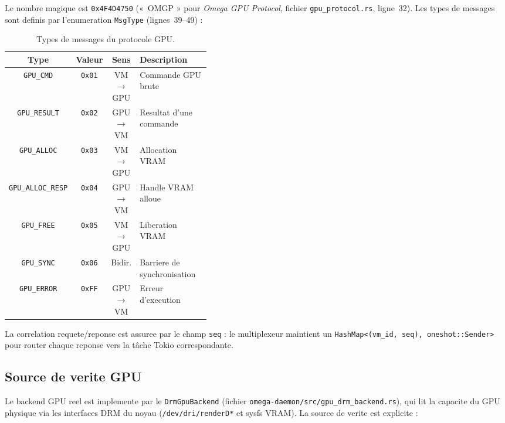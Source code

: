 Le nombre magique est \texttt{0x4F4D4750} («~OMGP » pour \textit{Omega GPU Protocol}, fichier \texttt{gpu\_protocol.rs}, ligne~32). Les types de messages sont definis par l'enumeration \texttt{MsgType} (lignes~39--49) :

\begin{table}[htbp]
    \centering
    \caption{Types de messages du protocole GPU.}
    \label{tab:gpu-msg-types}
    \begin{tabular}{c c c p{0.40\linewidth}}
        \toprule
        \textbf{Type} & \textbf{Valeur} & \textbf{Sens} & \textbf{Description} \\
        \midrule
        \texttt{GPU\_CMD} & \texttt{0x01} & VM$\to$GPU & Commande GPU brute \\
        \texttt{GPU\_RESULT} & \texttt{0x02} & GPU$\to$VM & Resultat d'une commande \\
        \texttt{GPU\_ALLOC} & \texttt{0x03} & VM$\to$GPU & Allocation VRAM \\
        \texttt{GPU\_ALLOC\_RESP} & \texttt{0x04} & GPU$\to$VM & Handle VRAM alloue \\
        \texttt{GPU\_FREE} & \texttt{0x05} & VM$\to$GPU & Liberation VRAM \\
        \texttt{GPU\_SYNC} & \texttt{0x06} & Bidir. & Barriere de synchronisation \\
        \texttt{GPU\_ERROR} & \texttt{0xFF} & GPU$\to$VM & Erreur d'execution \\
        \bottomrule
    \end{tabular}
\end{table}

La correlation requete/reponse est assuree par le champ \texttt{seq} : le multiplexeur maintient un \texttt{HashMap<(vm\_id, seq), oneshot::Sender>} pour router chaque reponse vers la tâche Tokio correspondante.

\subsection{Source de verite GPU}
\label{subsec:gpu-source-verite}

Le backend GPU reel est implemente par le \texttt{DrmGpuBackend} (fichier \texttt{omega-daemon/src/gpu\_drm\_backend.rs}), qui lit la capacite du GPU physique via les interfaces DRM du noyau (\texttt{/dev/dri/renderD*} et sysfs VRAM). La source de verite est explicite :

